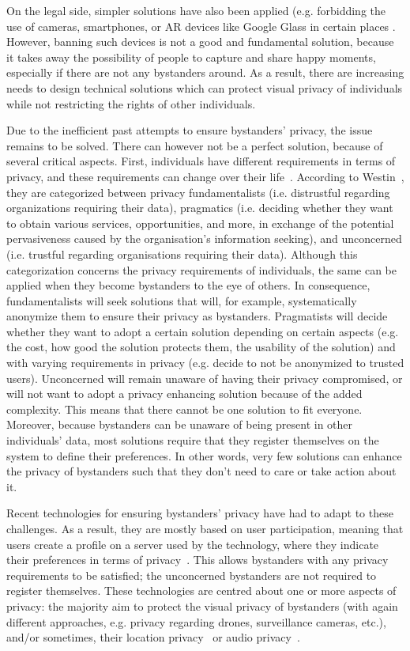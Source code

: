 \documentclass[conference, 11pt]{IEEEtran}
\begin{document}
On the legal side, simpler solutions have also been applied (e.g. forbidding the use of cameras, smartphones, or \ac{AR} devices like Google Glass in certain places \cite{shu2016cardea}. However, banning such devices is not a good and fundamental solution, because it takes away the possibility of people to capture and share happy moments, especially if there are not any bystanders around. As a result, there are increasing needs to design technical solutions which can protect visual privacy of individuals while not restricting the rights of other individuals. 

Due to the inefficient past attempts to ensure bystanders' privacy, the issue remains to be solved. There can however not be a perfect solution, because of several critical aspects. First, individuals have different requirements in terms of privacy, and these requirements can change over their life~\cite{shu2016cardea}. According to Westin~\cite{langheinrich2009privacy}, they are categorized between privacy fundamentalists (i.e. distrustful regarding organizations requiring their data), pragmatics (i.e. deciding whether they want to obtain various services, opportunities, and more, in exchange of the potential pervasiveness caused by the organisation's information seeking), and unconcerned (i.e. trustful regarding organisations requiring their data). Although this categorization concerns the privacy requirements of individuals, the same can be applied when they become bystanders to the eye of others. In consequence, fundamentalists will seek solutions that will, for example, systematically anonymize them to ensure their privacy as bystanders. Pragmatists will decide whether they want to adopt a certain solution depending on certain aspects (e.g. the cost, how good the solution protects them, the usability of the solution) and with varying requirements in privacy (e.g. decide to not be anonymized to trusted users). Unconcerned will remain unaware of having their privacy compromised, or will not want to adopt a privacy enhancing solution because of the added complexity. This means that there cannot be one solution to fit everyone. Moreover, because bystanders can be unaware of being present in other individuals' data, most solutions require that they register themselves on the system to define their preferences. In other words, very few solutions can enhance the privacy of bystanders such that they don't need to care or take action about it.

Recent technologies for ensuring bystanders' privacy have had to adapt to these challenges. As a result, they are mostly based on user participation, meaning that users create a profile on a server used by the technology, where they indicate their preferences in terms of privacy~\cite{chinomi2008PriSurv, shu2016cardea}. This allows bystanders with any privacy requirements to be satisfied; the unconcerned bystanders are not required to register themselves. These technologies are centred about one or more aspects of privacy: the majority aim to protect the visual privacy of bystanders (with again different approaches, e.g. privacy regarding drones, surveillance cameras, etc.), and/or sometimes, their location privacy~\cite{olteanu2018consensual} or audio privacy~\cite{larson2011accurate}. 
\end{document}
